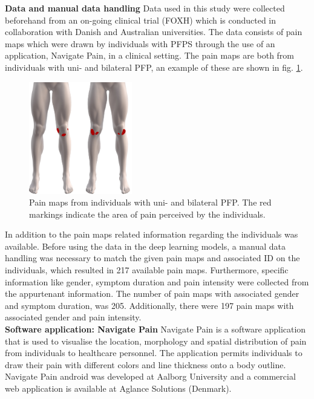 \textbf{Data and manual data handling} \newline
Data used in this study were collected beforehand from an on-going clinical trial (FOXH) which is conducted in collaboration with Danish and Australian universities. The data consists of pain maps which were drawn by individuals with PFPS through the use of an application, Navigate Pain, in a clinical setting. The pain maps are both from individuals with uni- and bilateral PFP, an example of these are shown in fig. \ref{fig:twoPainmaps}.

\begin{figure}[H]
\centering
\includegraphics[width=0.4\textwidth]{Figures/twoPainmaps}
\caption{Pain maps from individuals with uni- and bilateral PFP. The red markings indicate the area of pain perceived by the individuals.}
\label{fig:twoPainmaps}
\end{figure}

\noindent
In addition to the pain maps related information regarding the individuals was available.
Before using the data in the deep learning models, a manual data handling was necessary to match the given pain maps and associated ID on the individuals, which resulted in 217 available pain maps. Furthermore, specific information like gender, symptom duration and pain intensity were collected from the appurtenant information. The number of pain maps with associated gender and symptom duration, was 205. Additionally, there were 197 pain maps with associated gender and pain intensity.\\

\noindent
\textbf{Software application: Navigate Pain} \newline
Navigate Pain is a software application that is used to visualise the location, morphology and spatial distribution of pain from individuals to healthcare personnel. The application permits individuals to draw their pain with different colors and line thickness onto a body outline. Navigate Pain android was developed at Aalborg University and a commercial web application is available at Aglance Solutions (Denmark).\citep{Solutions2015}\\

